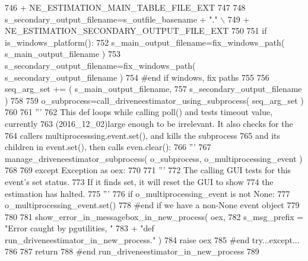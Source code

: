 \begin{DoxyCode}
746                 + NE\_ESTIMATION\_MAIN\_TABLE\_FILE\_EXT
747 
748         s\_secondary\_output\_filename=s\_outfile\_basename + \textcolor{stringliteral}{"."} \(\backslash\)
749                 + NE\_ESTIMATION\_SECONDARY\_OUTPUT\_FILE\_EXT
750 
751         \textcolor{keywordflow}{if} is\_windows\_platform():
752             s\_main\_output\_filename=fix\_windows\_path( s\_main\_output\_filename )
753             s\_secondary\_output\_filename=fix\_windows\_path( s\_secondary\_output\_filename )
754         \textcolor{comment}{#end if windows, fix paths}
755 
756         seq\_arg\_set += ( s\_main\_output\_filename,
757                                 s\_secondary\_output\_filename )
758 
759         o\_subprocess=call\_driveneestimator\_using\_subprocess( seq\_arg\_set )
760 
761         \textcolor{stringliteral}{'''}
762 \textcolor{stringliteral}{        This def loops while calling poll() and tests timeout value, currently}
763 \textcolor{stringliteral}{        (2016\_12\_02)large enough to be irrelevant.  It also checks for the }
764 \textcolor{stringliteral}{        callers multiprocesssing.event.set(), and kills the subprocess}
765 \textcolor{stringliteral}{        and its children in event.set(), then calls even.clear():}
766 \textcolor{stringliteral}{        '''}
767         manage\_driveneestimator\_subprocess( o\_subprocess, o\_multiprocessing\_event )
768 
769     \textcolor{keywordflow}{except} Exception \textcolor{keyword}{as} oex:
770 
771         \textcolor{stringliteral}{'''}
772 \textcolor{stringliteral}{        The calling GUI tests for this event's set status.}
773 \textcolor{stringliteral}{        If it finds set, it will reset the GUI to show}
774 \textcolor{stringliteral}{        the estimation has halted.}
775 \textcolor{stringliteral}{        '''}
776         \textcolor{keywordflow}{if} o\_multiprocessing\_event \textcolor{keywordflow}{is} \textcolor{keywordflow}{not} \textcolor{keywordtype}{None}:
777             o\_multiprocessing\_event.set()
778         \textcolor{comment}{#end if we have a non-None event object}
779         
780 
781         show\_error\_in\_messagebox\_in\_new\_process( oex, 
782                 s\_msg\_prefix = \textcolor{stringliteral}{"Error caught by pgutilities, "}
783                                 + \textcolor{stringliteral}{"def run\_driveneestimator\_in\_new\_process."} )
784         \textcolor{keywordflow}{raise} oex
785     \textcolor{comment}{#end try...except...}
786 
787     \textcolor{keywordflow}{return}
788 \textcolor{comment}{#end run\_driveneestimator\_in\_new\_process}
789 
\end{DoxyCode}
